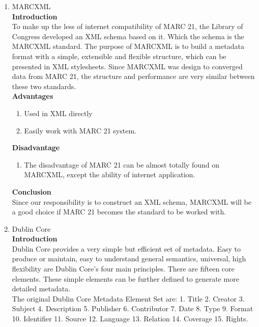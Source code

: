 \begin{enumerate}
	\item MARCXML\\
	{\bf Introduction}\\
	To make up the less of internet compatibility of MARC 21, the Library of Congress developed an XML schema based on it. Which the schema is the MARCXML standard. The purpose of MARCXML is to build a metadata format with a simple, extensible and flexible structure, which can be presented in XML stylesheets. Since MARCXML was design to converged data from MARC 21, the structure and performance are very similar between these two standards.  \\
	{\bf Advantages}
	\begin{enumerate}
		\item Used in XML directly
		\item Easily work with MARC 21 system.
	\end{enumerate}	
	{\bf Disadvantage}
	\begin{enumerate}
		\item The disadvantage of MARC 21 can be almost totally found on MARCXML, except the ability of internet application.
	\end{enumerate}
	{\bf Conclusion}\\
	Since our responsibility is to construct an XML schema, MARCXML will be a good choice if MARC 21 becomes the standard to be worked with.
	
	\item Dublin Core\\
	{\bf Introduction}\\
	Dublin Core provides a very simple but efficient set of metadata. Easy to produce or maintain, easy to understand general semantics, universal, high flexibility are Dublin Core’s four main principles. There are fifteen core elements. These simple elements can be further defined to generate more detailed metadata.\\
	The original Dublin Core Metadata Element Set are:
	1. Title 2. Creator 3. Subject 4. Description 5. Publisher 
	6. Contributor 7. Date 8. Type 9. Format 10. Identifier
	11. Source 12. Language 13. Relation 14. Coverage 15. Rights.
	\cite{dublincore2012}
	


\end{enumerate}
